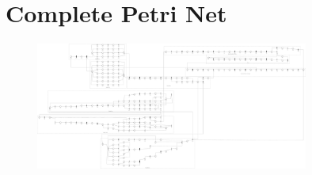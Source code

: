 








 
\recalctypearea
 \chapter{Complete Petri Net} 


  \begin{figure}[h]
    \centering
    \includegraphics[width=0.8\textwidth]{../../figures/petriNets/dot/completo/completo.pdf}
  \end{figure}

{}
\recalctypearea

